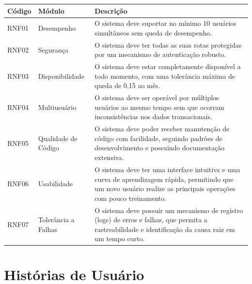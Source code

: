 \documentclass[
	12pt,				%
	openany,			%
	twoside,			%
	a4paper,			%
	english,			%
	brazil				%
	]{abntex2}
\begin{document}
\begin{quadro}[htb]
\centering
\caption{\label{quadro_rnf1}Requisitos Não Funcionais (RNF01 a RNF05)}
\hspace*{-1cm}
\begin{tabular}{|p{2.2cm}|p{4.0cm}|p{10.0cm}|}
    \hline
    \textbf{Código} & \textbf{Módulo} & \textbf{Descrição} \\ \hline
    RNF01 & Desempenho & O sistema deve suportar no mínimo 10 usuários simultâneos sem queda de desempenho. \\ \hline
    RNF02 & Segurança & O sistema deve ter todas as suas rotas protegidas por um mecanismo de autenticação robusto. \\ \hline
    RNF03 & Disponibilidade & O sistema deve estar completamente disponível a todo momento, com uma tolerância máxima de queda de 0,15 ao mês. \\ \hline
    RNF04 & Multiusuário & O sistema deve ser operável por múltiplos usuários ao mesmo tempo sem que ocorram inconsistências nos dados transacionais. \\ \hline
    RNF05 & Qualidade de Código & O sistema deve poder receber manutenção de código com facilidade, seguindo padrões de desenvolvimento e possuindo documentação extensiva. \\ \hline
RNF06 & Usabilidade & O sistema deve ter uma interface intuitiva e uma curva de aprendizagem rápida, permitindo que um novo usuário realize as principais operações com pouco treinamento. \\ \hline
RNF07 & Tolerância a Falhas & O sistema deve possuir um mecanismo de registro (logs) de erros e falhas, que permita a rastreabilidade e identificação da causa raiz em um tempo curto. \\ \hline
\end{tabular}
\end{quadro}

\FloatBarrier



\newpage
\section{Histórias de Usuário}
\end{document}
